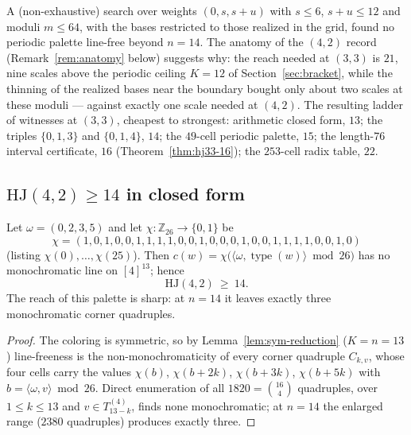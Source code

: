 \documentclass[12pt]{article}
\newcommand{\HJ}{\mathrm{HJ}}
\newcommand{\Z}{\mathbb{Z}}
\DeclareMathOperator{\type}{type}
\begin{document}
\begin{remark}\label{rem:gap33}
A (non-exhaustive) search over weights $(0,s,s{+}u)$ with $s\le 6$,
$s{+}u\le 12$ and moduli $m\le 64$, with the bases restricted to those
realized in the grid, found no periodic palette line-free beyond
$n=14$. The anatomy of the $(4,2)$ record (Remark~\ref{rem:anatomy}
below) suggests why: the reach needed at $(3,3)$ is $21$, nine scales
above the periodic ceiling $K=12$ of Section~\ref{sec:bracket}, while
the thinning of the realized bases near the boundary bought only about
two scales at these moduli --- against exactly one scale needed at
$(4,2)$. The resulting ladder of witnesses at $(3,3)$, cheapest to
strongest: arithmetic closed form, $13$; the triples $\{0,1,3\}$ and
$\{0,1,4\}$, $14$; the $49$-cell periodic palette, $15$; the
length-$76$ interval certificate, $16$ (Theorem~\ref{thm:hj33-16}); the
$253$-cell radix table, $22$.
\end{remark}

\subsection{\texorpdfstring{$\HJ(4,2)\ge 14$ in closed form}{HJ(4,2) >= 14 in closed form}}\label{sec:hj42}

\begin{theorem}\label{thm:hj42-14}
Let $\omega=(0,2,3,5)$ and let $\chi\colon\Z_{26}\to\{0,1\}$ be
\[
\chi=(1,0,1,0,0,1,1,1,1,0,0,1,0,0,0,1,0,0,1,1,1,1,0,0,1,0)
\]
\textup{(}listing $\chi(0),\dots,\chi(25)$\textup{)}. Then
$c(w)=\chi\bigl(\langle\omega,\type(w)\rangle\bmod 26\bigr)$ has no
monochromatic line on $[4]^{13}$; hence
\[
\HJ(4,2)\ \ge\ 14 .
\]
The reach of this palette is sharp: at $n=14$ it leaves exactly three
monochromatic corner quadruples.
\end{theorem}

\begin{proof}
The coloring is symmetric, so by Lemma~\ref{lem:sym-reduction}
($K=n=13$) line-freeness is the non-monochromaticity of every corner
quadruple $C_{k,v}$, whose four cells carry the values $\chi(b)$,
$\chi(b{+}2k)$, $\chi(b{+}3k)$, $\chi(b{+}5k)$ with
$b=\langle\omega,v\rangle\bmod 26$. Direct enumeration of all
$1820=\binom{16}{4}$ quadruples, over $1\le k\le 13$ and
$v\in T_{13-k}^{(4)}$, finds none monochromatic; at $n=14$ the enlarged
range ($2380$ quadruples) produces exactly three.
\end{proof}
\end{document}
